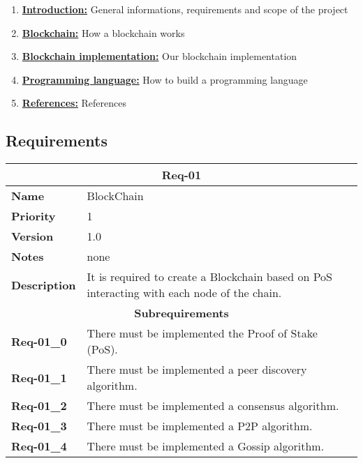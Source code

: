 \documentclass[../documentation.tex]{subfiles}
\begin{document}
\begin{enumerate}
    \item \hyperlink{section.1}{\textbf{Introduction:}}
        General informations, requirements and scope of the project
    
    \item \hyperlink{section.2}{\textbf{Blockchain:}}
        How a blockchain works
    
    \item \hyperlink{section.3}{\textbf{Blockchain implementation:}}
        Our blockchain implementation

    \item \hyperlink{section.4}{\textbf{Programming language:}}
        How to build a programming language

    \item \hyperlink{section.5}{\textbf{References:}}
        References
\end{enumerate}

\pagebreak

\subsection{Requirements}

\bgroup{}
\def\arraystretch{1.25}
\begin{center}
    \begin{tabular}{ |l|p{9cm}| }
        \hline
        \multicolumn{2}{|c|}{\textbf{Req-01}} \\
        \hline
        \textbf{Name} & BlockChain \\
        \hline
        \textbf{Priority} & 1 \\
        \hline
        \textbf{Version} & 1.0 \\
        \hline
        \textbf{Notes} & none \\
        \hline
        \textbf{Description} & It is required to create a Blockchain based on PoS interacting with each node of the chain. \\
        \hline
        \multicolumn{2}{|c|}{\textbf{Subrequirements}} \\
        \hline
        \textbf{Req-01\_0} & There must be implemented the Proof of Stake (PoS). \\
        \hline
        \textbf{Req-01\_1} & There must be implemented a peer discovery algorithm. \\
        \hline
        \textbf{Req-01\_2} & There must be implemented a consensus algorithm. \\
        \hline
        \textbf{Req-01\_3} & There must be implemented a P2P algorithm. \\
        \hline
        \textbf{Req-01\_4} & There must be implemented a Gossip algorithm. \\
        \hline
    \end{tabular}
\end{center}
\egroup{}
\end{document}
